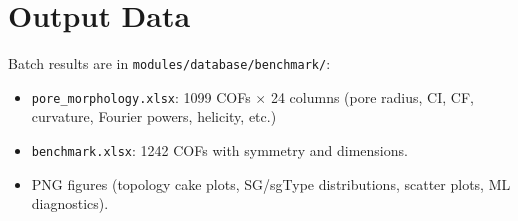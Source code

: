\documentclass[11pt,a4paper]{article}
\begin{document}
\section{Output Data}

Batch results are in \texttt{modules/database/benchmark/}:

\begin{itemize}
    \item \texttt{pore\_morphology.xlsx}: 1099 COFs $\times$ 24 columns
          (pore radius, CI, CF, curvature, Fourier powers, helicity, etc.)
    \item \texttt{benchmark.xlsx}: 1242 COFs with symmetry and dimensions.
    \item PNG figures (topology cake plots, SG/sgType distributions,
          scatter plots, ML diagnostics).
\end{itemize}
\end{document}
